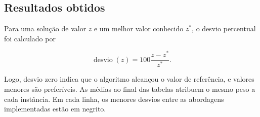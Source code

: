 \documentclass[12pt]{article}
\begin{document}
\subsection{Resultados obtidos}

Para uma solução de valor $z$ e um melhor valor conhecido $z^*$, o desvio percentual foi calculado por

\begin{equation}
    \operatorname{desvio}(z)=100\frac{z-z^*}{z^*}.
    \label{eq:desvio}
\end{equation}

Logo, desvio zero indica que o algoritmo alcançou o valor de referência, e valores menores são preferíveis. As médias ao final das tabelas atribuem o mesmo peso a cada instância. Em cada linha, os menores desvios entre as abordagens implementadas estão em negrito.
\end{document}
